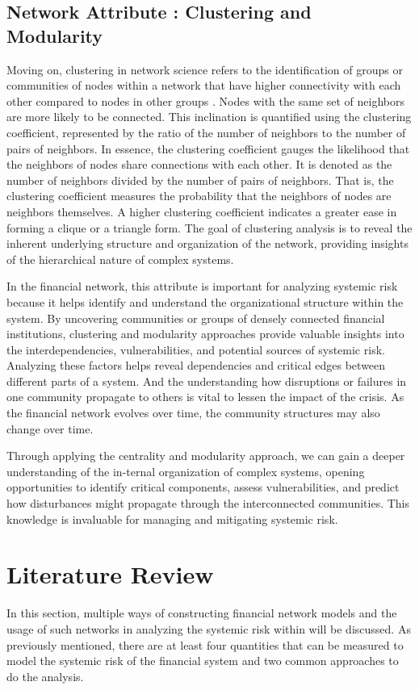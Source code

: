 \documentclass[a4paper,11pt]{article}
\begin{document}
\subsection{Network Attribute : Clustering and Modularity}
Moving on, clustering in network science refers to the identification of groups or communities of nodes within a network that have higher connectivity with each other compared to nodes in other groups \citep{Barabasi_2013}. Nodes with the same set of neighbors are more likely to be connected. This inclination is quantified using the clustering coefficient, represented by the ratio of the number of neighbors to the number of pairs of neighbors. In essence, the clustering coefficient gauges the likelihood that the neighbors of nodes share connections with each other. It is denoted as the number of neighbors divided by the number of pairs of neighbors. That is, the clustering coefficient measures the probability that the neighbors of nodes are neighbors themselves. A higher clustering coefficient indicates a greater ease in forming a clique or a triangle form. The goal of clustering analysis is to reveal the inherent underlying structure and organization of the network, providing insights of the hierarchical nature of complex systems.

In the financial network, this attribute is important for analyzing systemic risk because it helps identify and understand the organizational structure within the system. By uncovering communities or groups of densely connected financial institutions, clustering and modularity approaches provide valuable insights into the interdependencies, vulnerabilities, and potential sources of systemic risk. Analyzing these factors helps reveal dependencies and critical edges between different parts of a system. And the understanding how disruptions or failures in one community propagate to others is vital to lessen the impact of the crisis. As the financial network evolves over time, the community structures may also change over time.

Through applying the centrality and modularity approach, we can gain a deeper understanding of the in-ternal organization of complex systems, opening opportunities to identify critical components, assess vulnerabilities, and predict how disturbances might propagate through the interconnected communities. This knowledge is invaluable for managing and mitigating systemic risk.

\section{Literature Review}
In this section, multiple ways of constructing financial network models and the usage of such networks in analyzing the systemic risk within will be discussed. As previously mentioned, there are at least four quantities that can be measured to model the systemic risk of the financial system and two common approaches to do the analysis.
\end{document}
